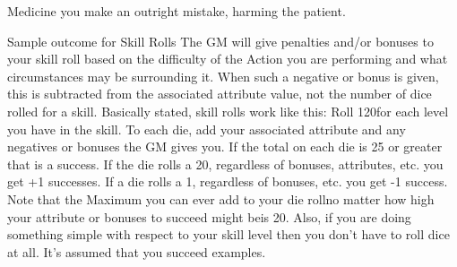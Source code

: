 \documentclass[twoside]{book}
\begin{document}
                  
                   Medicine   
                     you make an outright mistake, harming the
                     patient. 
                  
                
              Sample outcome for Skill Rolls  
             The GM will give penalties and/or bonuses to your
               skill roll based on the difficulty of the Action you are
               performing and what circumstances may be surrounding it.
               When such a negative or bonus is given, this is subtracted
               from the associated attribute value, not the number of
               dice rolled for a skill.  Basically stated, skill rolls work like this: Roll
               120for each level you have in the skill. To each die,
               add your associated attribute and any negatives or bonuses
               the GM gives you. If the total on each die is 25 or
               greater that is a success. If the die rolls a 20,
               regardless of bonuses, attributes, etc. you get +1
               successes. If a die rolls a 1, regardless of bonuses, etc.
               you get -1 success.  Note that the Maximum you can ever add to your die
               rollno matter how high your attribute or bonuses to
               succeed might beis 20.  Also, if you are doing something simple with respect
               to your skill level then you don't have to roll dice
               at all. It's assumed that you succeed examples.
               
  
  
\end{document}
